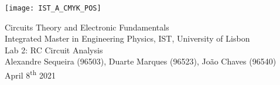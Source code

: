 \thispagestyle {empty}

\texttt{[image: IST\_A\_CMYK\_POS]}

\begin{center}

\vspace{1.0cm}

\vspace{1cm}
{\FontLb Circuits Theory and Electronic Fundamentals} \\ 
\vspace{0.5cm}
{\FontSn Integrated Master in Engineering Physics, IST, University of Lisbon} \\
\vspace{0.5cm}
{\FontSn Lab 2: RC Circuit Analysis} \\
\vspace{0.2cm}
{\FontSn Alexandre Sequeira (96503), Duarte Marques (96523), João Chaves (96540)} \\
\vspace{0.2cm}
{\FontSn April 8\textsuperscript{th} 2021} \\ %
%
\end{center}

